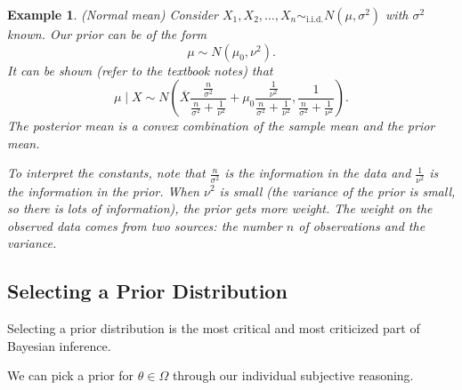 \documentclass{tufte-handout}
\newtheorem{ex}[thm]{Example}
\theoremstyle{definition}
\begin{document}
\begin{ex}
	(Normal mean) Consider $X_1,X_2,\ldots,X_n \sim_{\text{i.i.d.}} N(\mu, \sigma^2)$ with $\sigma^2$ known. Our prior can be of the form \[
		\mu \sim N(\mu_0, \nu^2)
	.\] 
	It can be shown (refer to the textbook notes) that \[
		\mu \mid X \sim N\left( \overline{X} \frac{\frac{n}{\sigma^2}}{\frac{n}{\sigma^2 } + \frac{1}{\nu^2}} + \mu_0 \frac{\frac{1}{\nu^2}}{\frac{n}{\sigma^2} + \frac{1}{\nu^2}}, \frac{1}{\frac{n}{\sigma^2} + \frac{1}{\nu^2}} \right)
	.\] The posterior mean is a convex combination of the sample mean and the prior mean.

	To interpret the constants, note that $\frac{n}{\sigma^2}$ is the information in the data and $\frac{1}{\nu^2}$ is the information in the prior. When $\nu^2$ is small (the variance of the prior is small, so there is lots of information), the prior gets more weight.
	The weight on the observed data comes from two sources: the number $n$ of observations and the variance.
\end{ex}

\subsection{Selecting a Prior Distribution}

Selecting a prior distribution is the most critical and most criticized part of Bayesian inference.

 We can pick a prior for $\theta \in \Omega$ through our individual subjective reasoning. 
\end{document}
